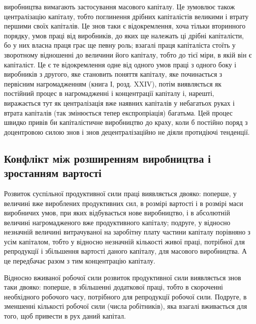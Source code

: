 \parcont{}  %
виробництва вимагають застосування масового капіталу. Це зумовлює
також централізацію капіталу, тобто поглинення дрібних
капіталістів великими і втрату першими своїх капіталів. Це знов
таки є відокремлення, хоча тільки вторинного порядку, умов праці
від виробників, до яких ще належать ці дрібні капіталісти, бо
у них власна праця грає ще певну роль; взагалі праця капіталіста
стоїть у зворотному відношенні до величини його капіталу, тобто
до тієї міри, в якій він є капіталіст. Це є те відокремлення одне
від одного умов праці з одного боку і виробників з другого,
яке становить поняття капіталу, яке починається з первісним
нагромадженням (книга І, розд. XXIV), потім виявляється як постійний
процес в нагромадженні і концентрації капіталу і, нарешті,
виражається тут як централізація вже наявних капіталів у небагатьох
руках і втрата капіталів (так змінюється тепер експропріація)
багатьма. Цей процес швидко привів би капіталістичне
виробництво до краху, коли б постійно поряд з доцентровою
силою знов і знов децентралізаційно не діяли протидіючі тенденції.

\subsection{Конфлікт між розширенням виробництва
і зростанням вартості}

Розвиток суспільної продуктивної сили праці виявляється
двояко: поперше, у величині вже вироблених продуктивних сил,
в розмірі вартості і в розмірі маси виробничих умов, при яких
відбувається нове виробництво, і в абсолютній величині нагромадженого
вже продуктивного капіталу; подруге, у відносно
незначній величині витрачуваної на заробітну плату частини
капіталу порівняно з усім капіталом, тобто у відносно незначній
кількості живої праці, потрібної для репродукції і збільшення
вартості даного капіталу, для масового виробництва. А це передбачає
разом з тим концентрацію капіталу.

Відносно вживаної робочої сили розвиток продуктивної сили
виявляється знов таки двояко: поперше, в збільшенні додаткової
праці, тобто в скороченні необхідного робочого часу, потрібного
для репродукції робочої сили. Подруге, в зменшенні кількості
робочої сили (числа робітників), яка взагалі вживається для
того, щоб привести в рух даний капітал.

